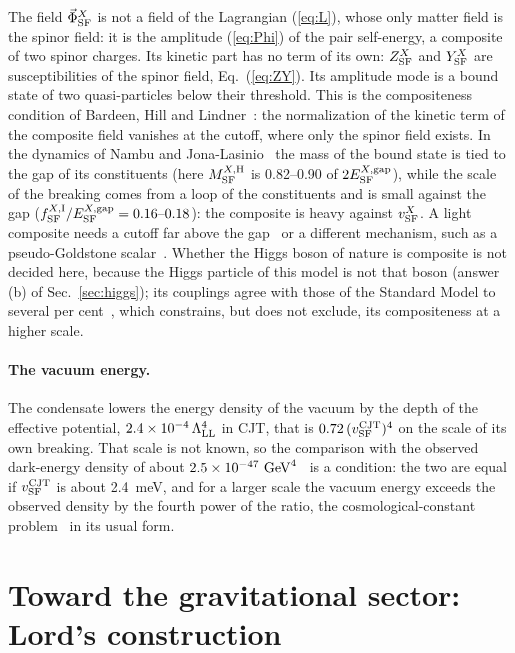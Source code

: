 \documentclass[aps,prd,onecolumn,superscriptaddress,nofootinbib,floatfix,longbibliography]{revtex4-2}
\newcommand{\LL}{{\rm LL}}
\newcommand{\SF}{{\rm SF}}
\begin{document}
The field $\vec\Phi^X_\SF$ is not a field of the Lagrangian (\ref{eq:L}), whose only matter field is the spinor field: it is the amplitude
(\ref{eq:Phi}) of the pair self-energy, a composite of two spinor charges. Its kinetic part has no term of its own: $Z^X_\SF$ and $Y^X_\SF$
are susceptibilities of the spinor field, Eq.~(\ref{eq:ZY}). Its amplitude mode is a bound state of two quasi-particles below their
threshold. This is the compositeness condition of Bardeen, Hill and Lindner~\cite{BHL1990}: the normalization of the kinetic term of the
composite field vanishes at the cutoff, where only the spinor field exists. In the dynamics of Nambu and
Jona-Lasinio~\cite{NJL1961} the mass of the bound state is tied to the gap of its constituents (here $M^{X,{\rm H}}_\SF$ is 0.82\mbox{--}0.90
of $2E^{X,{\rm gap}}_\SF$), while the scale of the breaking comes from a loop of the constituents and is small against the gap
($f^{X,{\rm I}}_\SF/E^{X,{\rm gap}}_\SF=0.16\mbox{--}0.18$): the composite is heavy against $v^X_\SF$. A light composite needs a cutoff far
above the gap~\cite{BHL1990,HillSimmons2003} or a different mechanism, such as a pseudo-Goldstone scalar~\cite{KaplanGeorgi1984,Agashe2005}.
Whether the Higgs boson of nature is composite is not decided here, because the Higgs particle of this model is not that boson
(answer (b) of Sec.~\ref{sec:higgs}); its couplings agree with those of the Standard Model to several
per cent~\cite{ATLAS2022,CMS2022}, which constrains, but does not exclude, its compositeness at a higher scale.

\paragraph*{The vacuum energy.} The condensate lowers the energy density of the vacuum by the depth of the effective potential,
$2.4\times10^{-4}\,\Lambda_\LL^4$ in CJT, that is $0.72\,(v^{\rm CJT}_\SF)^4$ on the scale of its own breaking. That scale is not known, so the
comparison with the observed dark-energy density of about $2.5\times10^{-47}~{\rm GeV}^4$~\cite{PDG2024} is a condition: the two are
equal if $v^{\rm CJT}_\SF$ is about 2.4~meV, and for a larger scale the vacuum energy exceeds the observed density by the fourth
power of the ratio, the cosmological-constant problem~\cite{Weinberg1989} in its usual form.

\section{Toward the gravitational sector: Lord's construction}
\label{sec:gravity}
\end{document}
